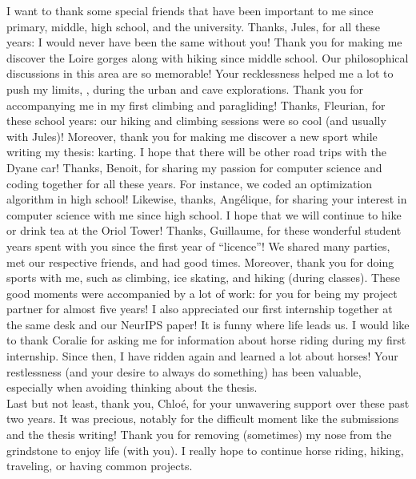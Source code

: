 I want to thank some special friends that have been important to me since primary, middle, high school, and the university.
Thanks, Jules, for all these years: I would never have been the same without you! 
Thank you for making me discover the Loire gorges along with hiking since middle school. 
Our philosophical discussions in this area are so memorable! 
Your recklessness helped me a lot to push my limits, \eg, during the urban and cave explorations.
Thank you for accompanying me in my first climbing and paragliding!
Thanks, Fleurian, for these school years: our hiking and climbing sessions were so cool (and usually with Jules)! 
Moreover, thank you for making me discover a new sport while writing my thesis: karting.
I hope that there will be other road trips with the Dyane car!
Thanks, Benoit, for sharing my passion for computer science and coding together for all these years. 
For instance, we coded an optimization algorithm in high school!
Likewise, thanks, Angélique, for sharing your interest in computer science with me since high school.
I hope that we will continue to hike or drink tea at the Oriol Tower!
Thanks, Guillaume, for these wonderful student years spent with you since the first year of ``licence''!
We shared many parties, met our respective friends, and had good times.
Moreover, thank you for doing sports with me, such as climbing, ice skating, and hiking (during classes).
These good moments were accompanied by a lot of work: for you for being my project partner for almost five years! 
I also appreciated our first internship together at the same desk and our NeurIPS paper! 
It is funny where life leads us.
I would like to thank Coralie for asking me for information about horse riding during my first internship.
Since then, I have ridden again and learned a lot about horses!
Your restlessness (and your desire to always do something) has been valuable, especially when avoiding thinking about the thesis.\\

Last but not least, thank you, Chloé, for your unwavering support over these past two years.
It was precious, notably for the difficult moment like the submissions and the thesis writing!
Thank you for removing (sometimes) my nose from the grindstone to enjoy life (with you).
I really hope to continue horse riding, hiking, traveling, or having common projects. 
